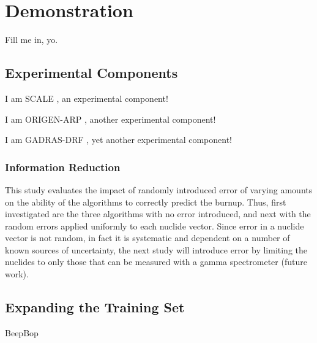 \chapter{Demonstration}
\label{ch:demo}

Fill me in, yo.

\section{Experimental Components}

%

I am SCALE \cite{scale}, an experimental component!

I am \gls{ORIGEN-ARP} \cite{origen}, another experimental component!

I am \gls{GADRAS-DRF} \cite{gadras}, yet another experimental component!





\subsection{Information Reduction}

This study evaluates the impact of randomly introduced error of varying amounts
on the ability of the algorithms to correctly predict the burnup. Thus, first
investigated are the three algorithms with no error introduced, and next with
the random errors applied uniformly to each nuclide vector. Since error in a
nuclide vector is not random, in fact it is systematic and dependent on a
number of known sources of uncertainty, the next study will introduce error by
limiting the nuclides to only those that can be measured with a gamma
spectrometer (future work).

\section{Expanding the Training Set}
\label{sec:newtrain}

BeepBop
